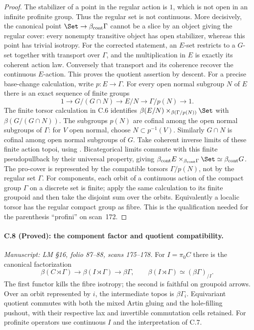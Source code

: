 \begin{proof}
The stabilizer of a point in the regular
action is $1$, which is not open in an
infinite profinite group. Thus the regular
set is not continuous. More decisively,
the canonical point $\Set\to
\beta_{\mathrm{cont}}\Gamma$ cannot be a
slice by an object giving the regular
cover: every nonempty transitive object
has open stabilizer, whereas this point
has trivial isotropy. For the corrected
statement, an $E$-set restricts to a $G$-set together with
transport over $\Gamma$, and the multiplication in $E$
is exactly its coherent action law. Conversely that
transport and its coherence recover the continuous
$E$-action. This proves the quotient assertion by descent.
For a precise base-change calculation, write $p:E\to\Gamma$.
For every open normal subgroup $N$ of $E$ there is an exact
sequence of finite groups
\[
 1\to G/(G\cap N)\to E/N\to\Gamma/p(N)\to1.
\]
The finite torsor calculation in C.6 identifies
$\beta(E/N)\mathbin{\times}_{\beta(\Gamma/p(N))}\Set$
with $\beta(G/(G\cap N))$. The subgroups $p(N)$ are cofinal
among the open normal subgroups of $\Gamma$: for $V$ open
normal, choose $N\subset p^{-1}(V)$. Similarly $G\cap N$
is cofinal among open normal subgroups of $G$. Take coherent
inverse limits of these finite action topoi, using
\citep[VI, \S8]{SGA4II}. Bicategorical limits commute with
this finite pseudopullback by their universal property,
giving $\beta_{\rm cont}E\times_{\beta_{\rm cont}\Gamma}\Set
\simeq\beta_{\rm cont}G$. The pro-cover is represented by
the compatible torsors $\Gamma/p(N)$, not by the regular
set $\Gamma$. For components, each orbit of a continuous
action of the compact group $\Gamma$ on a discrete set is
finite; apply the same calculation to its finite groupoid
and then take the disjoint sum over the orbits.
Equivalently a localic torsor has the regular compact
group as fibre. This is the qualification
needed for the parenthesis ``profini''
on scan~172.
\end{proof}

\paragraph{C.8 (Proved): the component factor and quotient compatibility.}\label{C8}
\textit{Manuscript: LM \S16, folio 87--88, scans 175--178.}
For $I=\pi_0C$ there is the canonical factorization
\[
 \beta(C\rtimes\Gamma)\longrightarrow
 \beta(I\rtimes\Gamma)\longrightarrow\beta\Gamma,
 \qquad \beta(I\rtimes\Gamma)\simeq(\beta\Gamma)_{/I}.
                                                               \tag{C.8.1}
\]
The first functor kills the fibre isotropy;
the second is faithful on groupoid arrows.
Over an orbit represented by $i$, the
intermediate topos is $\beta\Gamma_i$.
Equivariant quotient commutes with both
the mixed Artin gluing and the hole-filling
pushout, with their respective lax and
invertible commutation cells retained.
For profinite operators use continuous
$I$ and the interpretation of C.7.

